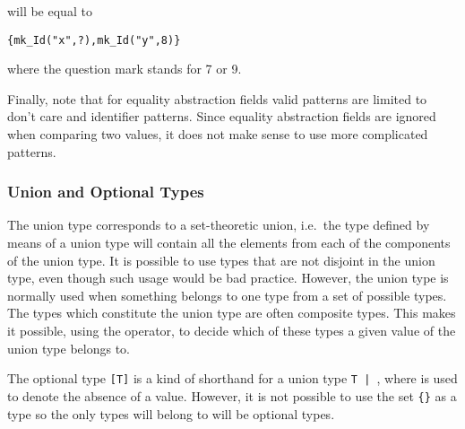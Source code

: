 \documentclass[\pformat,12pt]{article}
\begin{document}
\begin{description}
will be equal to

\begin{alltt}
  \{mk_Id("x",?),mk_Id("y",8)\}
\end{alltt}

where the question mark stands for 7 or 9.

Finally, note that for equality abstraction fields valid patterns are
limited to don't care and identifier patterns. Since equality
abstraction fields are ignored when comparing two values, it does not
make sense to use more complicated patterns.
\end{description}

\subsubsection{Union and Optional Types}\label{unions}

The union type corresponds to a set-theoretic union, i.e.\ the type
defined by means of a union type will contain all the elements from
each of the components of the union type. It is possible to use types
that are not disjoint in the union type, even though such usage
would be bad practice.  However, the union type is normally used when
something belongs to one type from a set of possible types.  The
types which constitute the union type are often composite types.  This
makes it possible, using the  operator, to decide which of
these types a given value of the union type belongs to.

The optional type {\tt [T]} is a kind of shorthand for a union type {\tt T |
  }, where  is used to denote the absence of a
value. However, it is not possible to use the set {\tt \{\}}
as a type so the only types  will belong to will be optional
types. 
\end{document}
